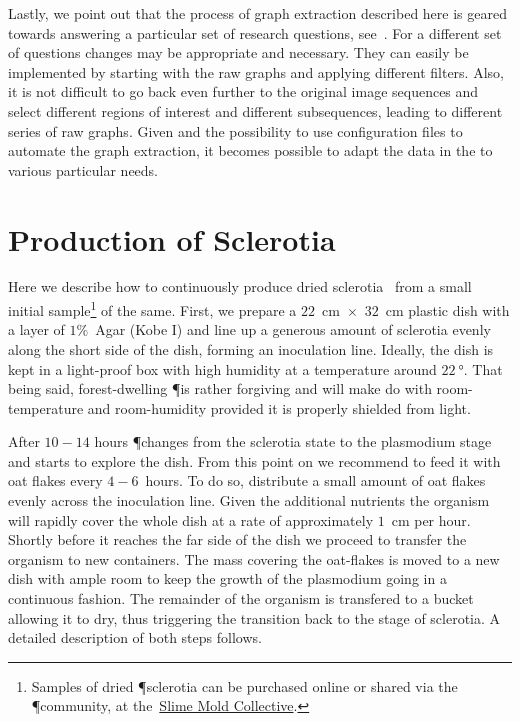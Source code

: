 		Lastly, we point out that the process of graph extraction described here is geared towards answering a particular set of research questions, see~\cite{dirnberger2016}. For a different set of questions changes may be appropriate and necessary. They can easily be implemented by starting with the raw graphs and applying different filters. Also, it is not difficult to go back even further to the original image sequences and select different regions of interest and different subsequences, leading to different series of raw graphs. Given \NEFI and the possibility to use configuration files to automate the graph extraction, it becomes possible to adapt the data in the \data to various particular needs.

	\section{Production of Sclerotia}

		Here we describe how to continuously produce dried sclerotia~\cite{lifecycle} from a small initial sample\footnote{Samples of dried \P sclerotia can be purchased online or shared via the \P community, \eg at the~\href{http://slimoco.ning.com/}{Slime Mold Collective}.} of the same. First, we prepare a $22$~cm~$\times$~$32$~cm plastic dish with a layer of $1 \%$~Agar (Kobe I) and line up a generous amount of sclerotia evenly along the short side of the dish, forming an inoculation line. Ideally, the dish is kept in a light-proof box with high humidity at a temperature around $\SI{22}{\degree}$. That being said, forest-dwelling \P is rather forgiving and will make do with room-temperature and room-humidity provided it is properly shielded from light.

		After $10-14$ hours \P changes from the sclerotia state to the plasmodium stage and starts to explore the dish. From this point on we recommend to feed it with oat flakes every $4-6$~hours. To do so, distribute a small amount of oat flakes evenly across the inoculation line. Given the additional nutrients the organism will rapidly cover the whole dish at a rate of approximately $1$~cm per hour. Shortly before it reaches the far side of the dish we proceed to transfer the organism to new containers. The mass covering the oat-flakes is moved to a new dish with ample room to keep the growth of the plasmodium going in a continuous fashion. The remainder of the organism is transfered to a bucket allowing it to dry, thus triggering the transition back to the stage of sclerotia. A detailed description of both steps follows.

